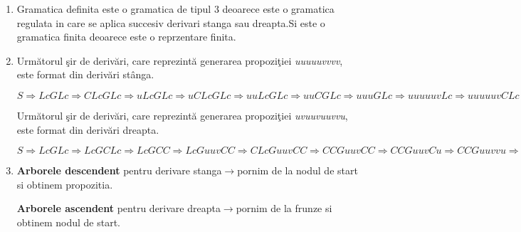 \begin{enumerate}
\begin{enumerate}
\item[b)]
Gramatica definita este o gramatica de tipul 3 deoarece este o gramatica regulata in care se aplica succesiv derivari stanga sau dreapta.Si este o gramatica finita deoarece este o reprzentare finita.

\item[c)]
Următorul şir de derivări, care reprezintă generarea propoziţiei \textit{uuuuuvvvv}, este format din derivări stânga.

$S \Rightarrow LcGLc \Rightarrow CLcGLc \Rightarrow uLcGLc \Rightarrow uCLcGLc \Rightarrow uuLcGLc \Rightarrow uuCGLc  \Rightarrow uuuGLc \Rightarrow uuuuuvLc \Rightarrow uuuuuvCLc \Rightarrow uuuuuvvLc \Rightarrow uuuuuvvCLc \Rightarrow uuuuuvvvLc \Rightarrow uuuuuvvvC \Rightarrow uuuuuvvvv $

Următorul şir de derivări, care reprezintă generarea propoziţiei \textit{uvuuvuuvvu}, este format din derivări dreapta.

$S \Rightarrow LcGLc \Rightarrow LcGCLc \Rightarrow LcGCC \Rightarrow LcGuuvCC \Rightarrow CLcGuuvCC \Rightarrow CCGuuvCC \Rightarrow CCGuuvCu \Rightarrow CCGuuvvu \Rightarrow CCuuvuuvvu \Rightarrow Cvuuvuuvvu \Rightarrow uvuuvuuvvu  $

\item[d)]
\textbf{Arborele descendent} pentru derivare stanga$\rightarrow$pornim de la nodul de start si obtinem propozitia.

\begin{figure}[H]
\end{figure}

\textbf{Arborele ascendent} pentru derivare dreapta$\rightarrow$pornim de la frunze si obtinem nodul de start.\\\\

\begin{figure}[H]
\end{figure}


\end{enumerate}
\end{enumerate}
